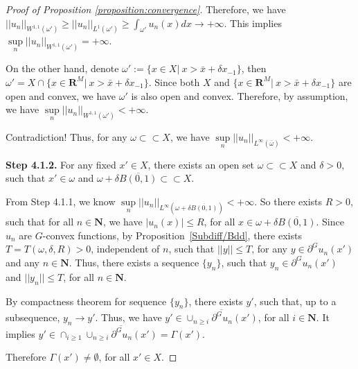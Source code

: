 \documentclass[a4paper, 11pt]{amsart}
\numberwithin{equation}{section}
\theoremstyle{plain}
\theoremstyle{definition}
\theoremstyle{remark}
\newcommand{\R}{\mathbf{R}}
\newcommand{\N}{\mathbf{N}}
\begin{document}
\begin{proof}[Proof of Proposition \ref{proposition:convergence}]
	Therefore, we have $||u_n||_{W^{1,1}(\omega')} \ge ||u_n||_{L^{1}(\omega')} \ge \int_{\omega'} u_n(x) dx \longrightarrow +\infty$. This implies $\sup\limits_{n} ||u_n||_{W^{1,1}(\omega')} = +\infty$.
	
	On the other hand, denote $\omega' := \{x\in X|~ x>\bar{x}+\delta x_{-1}\}$, then $\omega' = X \cap \{x\in \R^M|~ x> \bar{x}+\delta x_{-1} \}$. Since both $X$ and $\{x\in \R^M|~ x> \bar{x}+\delta x_{-1} \}$ are open and convex, we have $\omega'$ is also open and convex. Therefore, by assumption, we have $\sup\limits_{n} ||u_n||_{W^{1,1}(\omega')} < +\infty.$ 
	
	Contradiction! Thus, for any $\omega \subset \subset X$, we have $\sup\limits_{n}||u_n||_{L^{\infty}(\bar{\omega})}<+\infty$.\medskip
	
	{\bf Step 4.1.2.} For any fixed $x'\in X$, there exists an open set $\omega \subset \subset X$ and $\delta>0$, such that $x'\in \omega$ and $\omega + \delta \overline{B(0,1)} \subset \subset X$.
	
	From Step 4.1.1, we know  $\sup\limits_{n}||u_n||_{L^{\infty}(\omega + \delta \overline{B(0,1)})} < +\infty$. 
	So there exists $R>0$, such that for all $n\in \N$, we have $|u_n(x)|\le R$, for all $x \in \omega + \delta \overline{B(0,1)}$. Since $u_n$ are $G$-convex functions, by Proposition~\ref{Subdiff/Bdd}, there exists $T = T(\omega, \delta, R) >0$, independent of $n$, such that $||y||\le T$, for any $y \in \partial^G u_n(x')$ and any $n\in \N$. Thus, there exists a sequence $\{ y_n \}$, such that $y_n \in \partial^G u_n(x')$ and $||y_n||\le T$, for all $n\in \N$.
	
	By compactness theorem for sequence $\{ y_n \}$,  there exists $y'$, such that, up to a subsequence, $y_n \longrightarrow y'$. Thus, we have $y' \in \overline{\cup_{n\ge i}\partial^G u_n(x')}$, for all $i\in \N$. It implies $y' \in \cap_{i\ge 1} \overline{\cup_{n\ge i}\partial^G u_n(x')} = \Gamma (x')$. 
	
	Therefore $\Gamma(x') \neq \emptyset$, for all $x' \in X$.\medskip
	
	

\end{proof}
\end{document}
